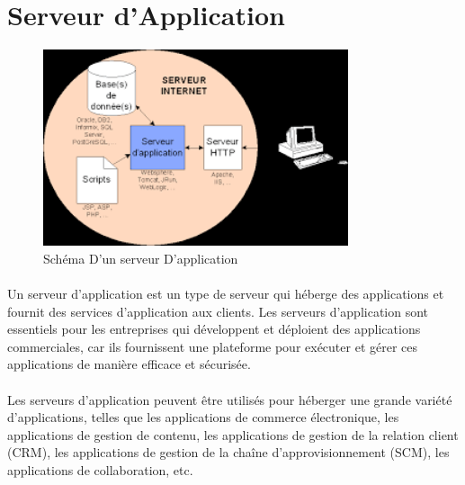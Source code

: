 \section{Serveur d'Application}
	\begin{figure}[h]
	\begin{center}
		
	
		
	\includegraphics[width=0.8\textwidth]{PhotoMemoire/serveur_application.png}
\caption{Schéma D'un serveur D'application}
\end{center}
\end{figure}
\paragraph{ }

Un serveur d'application est un type de serveur qui héberge des applications et fournit des services d'application aux clients. Les serveurs d'application sont essentiels pour les entreprises qui développent et déploient des applications commerciales, car ils fournissent une plateforme pour exécuter et gérer ces applications de manière efficace et sécurisée.
\paragraph{ }
Les serveurs d'application peuvent être utilisés pour héberger une grande variété d'applications, telles que les applications de commerce électronique, les applications de gestion de contenu, les applications de gestion de la relation client (CRM), les applications de gestion de la chaîne d'approvisionnement (SCM), les applications de collaboration, etc.

